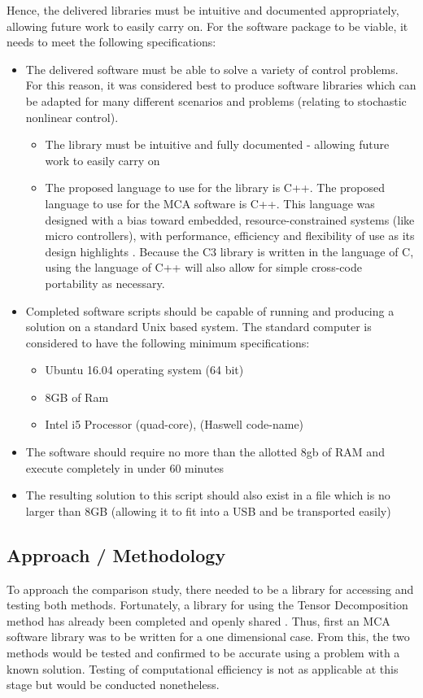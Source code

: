 \documentclass[11pt,draftd]{article}
\begin{document}
\noindent Hence, the delivered libraries must be intuitive and documented appropriately, allowing future work to easily carry on. For the software package to be viable, it needs to meet the following specifications:
\begin{itemize}
	\item The delivered software must be able to solve a variety of control problems. For this reason, it was considered best to produce software libraries which can be adapted for many different scenarios and problems (relating to stochastic nonlinear control).
	\begin{itemize}
		\item The library must be intuitive and fully documented - allowing future work to easily carry on
		\item The proposed language to use for the library is C++.  The proposed language to use for the MCA software is C++. This language was designed with a bias toward embedded, resource-constrained systems (like micro controllers), with performance, efficiency and flexibility of use as its design highlights \cite{c++film}. Because the C3 library is written in the language of C, using the language of C++ will also allow for simple cross-code portability as necessary.
	\end{itemize}
	\item Completed software scripts should be capable of running and producing a solution on a standard Unix based system. The standard computer is considered to have the following minimum specifications:
	\begin{itemize}
		\item Ubuntu 16.04 operating system (64 bit)
		\item 8GB of Ram
		\item Intel i5 Processor (quad-core), (Haswell code-name)
	\end{itemize}
	\item The software should require no more than the allotted 8gb of RAM and execute completely in under 60 minutes
	\item The resulting solution to this script should also exist in a file which is no larger than 8GB (allowing it to fit into a USB and be transported easily)
\end{itemize}

\noindent

\subsection{Approach / Methodology}
To approach the comparison study, there needed to be a library for accessing and testing both methods. Fortunately, a library for using the Tensor Decomposition method has already been completed and openly shared \cite{c3c} \cite{c3cs}. Thus, first an MCA software library was to be written for a one dimensional case. From this, the two methods would be tested and confirmed to be accurate using a problem with a known solution. Testing of computational efficiency is not as applicable at this stage but would be conducted nonetheless.\\
\end{document}
